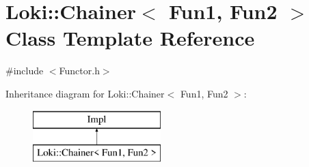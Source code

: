 \hypertarget{classLoki_1_1Chainer}{}\section{Loki\+:\+:Chainer$<$ Fun1, Fun2 $>$ Class Template Reference}
\label{classLoki_1_1Chainer}


{\ttfamily \#include $<$Functor.\+h$>$}

Inheritance diagram for Loki\+:\+:Chainer$<$ Fun1, Fun2 $>$\+:\begin{figure}[H]
\begin{center}
\leavevmode
\includegraphics[height=2.000000cm]{classLoki_1_1Chainer}
\end{center}
\end{figure}
